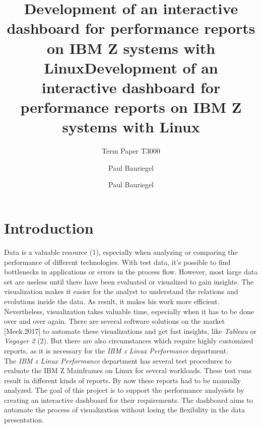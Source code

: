 \documentclass[american,a4paper,oneside,,tablecaptionabove]{scrbook}
\title{Development of an interactive dashboard for performance reports on IBM Z
systems with Linux}
\subtitle{Term Paper T3000}
\author{Paul Bauriegel}
\date{}
\title{Development of an interactive dashboard for performance reports on IBM Z
systems with Linux}
\author{Paul Bauriegel}
\begin{document}

\begin{titlepage}
\afterpage{\restorepagecolor}
\newcommand{\colorRule}[3][black]{\textcolor[HTML]{#1}{\rule{#2}{#3}}}
\end{titlepage}
\restoregeometry




\pagestyle{plain}

{
\setcounter{tocdepth}{2}
\tableofcontents
}

\pagestyle{fancy}
\setcounter{page}{1}
\chapter{Introduction}\label{introduction}

Data is a valuable resource (1), especially when analyzing or comparing
the performance of different technologies. With test data, it's possible
to find bottlenecks in applications or errors in the process flow.
However, most large data set are useless until there have been evaluated
or visualized to gain insights. The visualization makes it easier for
the analyst to understand the relations and evolutions inside the data.
As result, it makes his work more efficient. Nevertheless, visualization
takes valuable time, especially when it has to be done over and over
again. There are several software solutions on the market
{[}Meek.2017{]} to automate these visualizations and get fast insights,
like \emph{Tableau} or \emph{Voyager 2} (2). But there are also
circumstances which require highly customized reports, as it is
necessary for the \emph{IBM z Linux Performance} department.\\
The \emph{IBM z Linux Performance} department has several test
procedures to evaluate the IBM Z Mainframes on Linux for several
workloads. These test runs result in different kinds of reports. By now
these reports had to be manually analyzed. The goal of this project is
to support the performance analysists by creating an interactive
dashboard for their requirements. The dashboard aims to automate the
process of visualization without losing the flexibility in the data
presentation.
\end{document}
